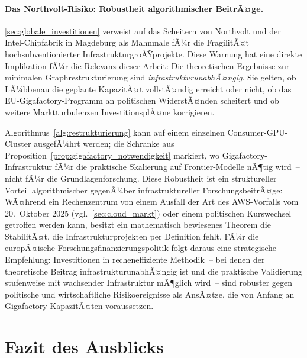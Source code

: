 ﻿\documentclass[12pt, a4paper, openany]{report}
\begin{document}
\paragraph{Das Northvolt-Risiko: Robustheit algorithmischer BeitrÃ¤ge.}
\cref{sec:globale_investitionen} verweist auf das Scheitern von
Northvolt und der Intel-Chipfabrik in Magdeburg als Mahnmale fÃ¼r die
FragilitÃ¤t hochsubventionierter InfrastrukturgroÃŸprojekte.  Diese
Warnung hat eine direkte Implikation fÃ¼r die Relevanz dieser Arbeit:
Die theoretischen Ergebnisse zur minimalen Graphrestrukturierung sind
\emph{infrastrukturunabhÃ¤ngig}.  Sie gelten, ob LÃ¼bbenau die geplante
KapazitÃ¤t vollstÃ¤ndig erreicht oder nicht, ob das EU-Gigafactory-Programm
an politischen WiderstÃ¤nden scheitert und ob weitere Marktturbulenzen
InvestitionsplÃ¤ne korrigieren.

Algorithmus~\ref{alg:restrukturierung} kann auf einem einzelnen
Consumer-GPU-Cluster ausgefÃ¼hrt werden; die Schranke aus
Proposition~\ref{prop:gigafactory_notwendigkeit} markiert, wo
Gigafactory-Infrastruktur fÃ¼r die praktische Skalierung auf
Frontier-Modelle nÃ¶tig wird~-- nicht fÃ¼r die Grundlagenforschung.
Diese Robustheit ist ein struktureller Vorteil algorithmischer
gegenÃ¼ber infrastruktureller ForschungsbeitrÃ¤ge: WÃ¤hrend ein
Rechenzentrum von einem Ausfall der Art des AWS-Vorfalls vom
20.~Oktober 2025 (vgl.\ \cref{sec:cloud_markt}) oder einem
politischen Kurswechsel getroffen werden kann, besitzt ein mathematisch
bewiesenes Theorem die StabilitÃ¤t, die Infrastrukturprojekten per
Definition fehlt.  FÃ¼r die europÃ¤ische Forschungsfinanzierungspolitik
folgt daraus eine strategische Empfehlung: Investitionen in
recheneffiziente Methodik~-- bei denen der theoretische Beitrag
infrastrukturunabhÃ¤ngig ist und die praktische Validierung stufenweise
mit wachsender Infrastruktur mÃ¶glich wird~-- sind robuster gegen
politische und wirtschaftliche Risikoereignisse als AnsÃ¤tze, die von
Anfang an Gigafactory-KapazitÃ¤ten voraussetzen.

\section*{Fazit des Ausblicks}
\end{document}
